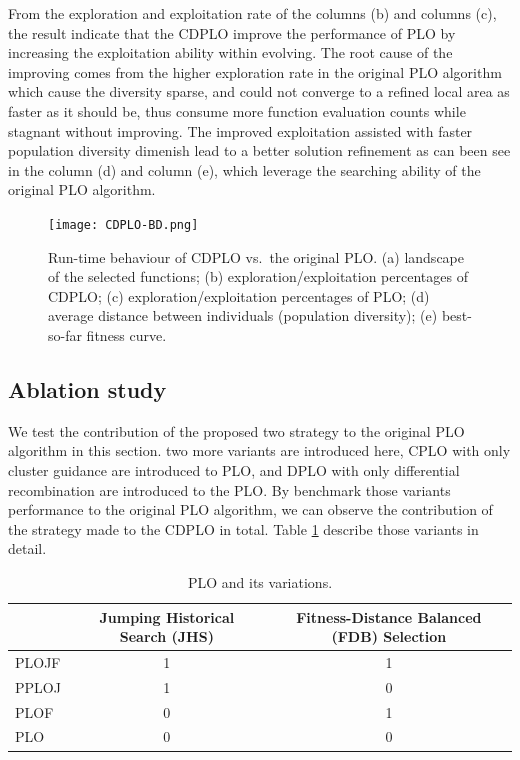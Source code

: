 \documentclass[3p]{elsarticle}
\begin{document}
From the exploration and exploitation rate of the columns (b) and columns (c), the result indicate that the CDPLO improve the performance of PLO by increasing the exploitation ability within evolving. The root cause of the improving comes from the higher exploration rate in the original PLO algorithm which cause the diversity sparse, and could not converge to a refined local area as faster as it should be, thus consume more function evaluation counts while stagnant without improving. The improved exploitation assisted with faster population diversity dimenish lead to a better solution refinement as can been see in the column (d) and column (e), which leverage the searching ability of the original PLO algorithm.

\begin{figure}[htbp]
  \centering
  \texttt{[image: CDPLO-BD.png]}
  \caption{Run-time behaviour of CDPLO
           vs.\ the original PLO.
           (a) landscape of the selected functions;
           (b) exploration/exploitation percentages of CDPLO;
           (c) exploration/exploitation percentages of PLO;
           (d) average distance between individuals (population diversity);
           (e) best-so-far fitness curve.}
  \label{fig: CDPLO-BD}
\end{figure}

\subsection{Ablation study}
We test the contribution of the proposed two strategy to the original PLO algorithm in this section. two more variants are introduced here, CPLO with only cluster guidance are introduced to PLO, and DPLO with only differential recombination are introduced to the PLO. By benchmark those variants performance to the original PLO algorithm, we can observe the contribution of the strategy made to the CDPLO in total. Table \ref{table: PLO variants} describe those variants in detail.

\begin{table}[h!]
\centering
\caption{PLO and its variations.}
\label{table: PLO variants}
\begin{tabular}{lcc}
\toprule
 & Jumping Historical Search (JHS) & Fitness-Distance Balanced (FDB) Selection \\
\midrule
PLOJF & 1 & 1 \\ 
PPLOJ & 1 & 0 \\ 
PLOF  & 0 & 1 \\ 
PLO   & 0 & 0 \\ 
\bottomrule
\end{tabular}
\end{table}
\end{document}
